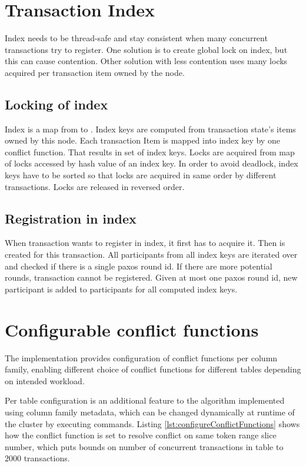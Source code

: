 \section{Transaction Index}
Index needs to be thread-safe and stay consistent when many concurrent transactions try to register. One solution is to create global lock on index, but this can cause contention. Other solution with less contention uses many locks acquired per transaction item owned by the node. 

\subsection{Locking of index}
Index is a map from  to . Index keys are computed from transaction state’s items owned by this node. Each transaction Item is mapped into index key by one conflict function. That results in set of index keys. Locks are acquired from map of locks accessed by hash value of an index key. In order to avoid deadlock, index keys have to be sorted so that locks are acquired in same order by different transactions. Locks are released in reversed order.


\subsection{Registration in index}
When transaction wants to register in index, it first has to acquire it. Then  is created for this transaction. All participants from all index keys are iterated over and checked if there is a single paxos round id. If there are more potential rounds, transaction cannot be registered. Given at most one paxos round id, new participant is added to participants for all computed index keys.


\section{Configurable conflict functions}
The implementation provides configuration of conflict functions per column family, enabling different choice of conflict functions for different tables depending on intended workload.

Per table configuration is an additional feature to the algorithm implemented using column family metadata, which can be changed dynamically at runtime of the cluster by executing  commands. Listing \ref{lst:configureConflictFunctions} shows how the conflict function is set to resolve conflict on same token range slice number, which puts bounds on number of concurrent transactions in table  to $2000$ transactions. 

